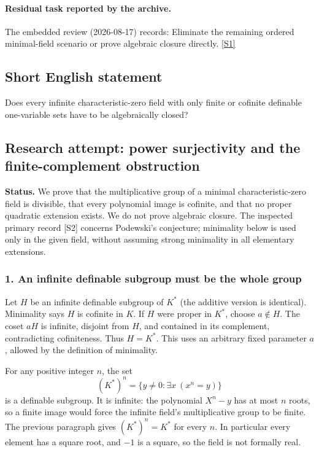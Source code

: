 \documentclass[11pt,a4paper]{article}
\newcommand{\sref}[2]{\hyperlink{source:#1:#2}{[S#2]}}
\begin{document}
\paragraph{Residual task reported by the archive.}

The embedded review (2026-08-17) records: Eliminate the remaining ordered minimal-field scenario or prove algebraic closure directly. \sref{1466}{1}

\subsection{Short English statement}

Does every infinite characteristic-zero field with only finite or cofinite definable one-variable sets have to be algebraically closed?

\subsection{Research attempt: power surjectivity and the finite-complement obstruction}
\textbf{Status.} We prove that the multiplicative group of a minimal characteristic-zero field is divisible, that every polynomial image is cofinite, and that no proper quadratic extension exists. We do not prove algebraic closure. The inspected primary record [S2] concerns Podewski's conjecture; minimality below is used only in the given field, without assuming strong minimality in all elementary extensions.

\subsubsection{1. An infinite definable subgroup must be the whole group}
Let $H$ be an infinite definable subgroup of $K^*$ (the additive version is identical). Minimality says $H$ is cofinite in $K$. If $H$ were proper in $K^*$, choose $a\notin H$. The coset $aH$ is infinite, disjoint from $H$, and contained in its complement, contradicting cofiniteness. Thus $H=K^*$. This uses an arbitrary fixed parameter $a$, allowed by the definition of minimality.

For any positive integer $n$, the set
\[(K^*)^n=\{y\ne0:\exists x\ (x^n=y)\}
\]
is a definable subgroup. It is infinite: the polynomial $X^n-y$ has at most $n$ roots, so a finite image would force the infinite field's multiplicative group to be finite. The previous paragraph gives $(K^*)^n=K^*$ for every $n$. In particular every element has a square root, and $-1$ is a square, so the field is not formally real.
\end{document}
